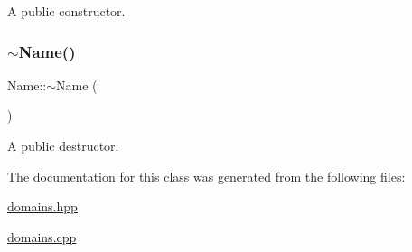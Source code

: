 A public constructor. \mbox{\label{class_name_ada9b23969d47506787d185c3fda43d77}} 
\subsubsection{\texorpdfstring{$\sim$\+Name()}{~Name()}}
{\footnotesize\ttfamily Name\+::$\sim$\+Name (\begin{DoxyParamCaption}{ }\end{DoxyParamCaption})}

A public destructor. 

The documentation for this class was generated from the following files\+:\begin{DoxyCompactItemize}
\item 
\hyperlink{domains_8hpp}{domains.\+hpp}\item 
\hyperlink{domains_8cpp}{domains.\+cpp}\end{DoxyCompactItemize}
